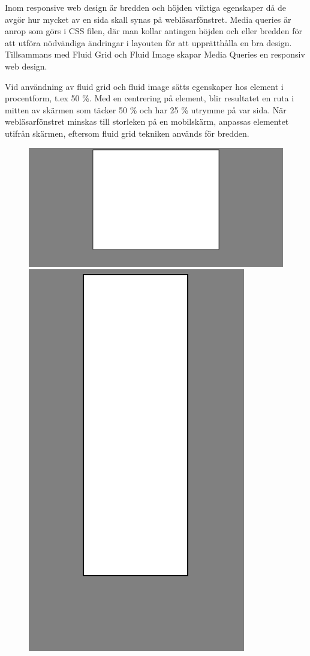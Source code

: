 \documentclass[11pt]{article}
\begin{document}
Inom responsive web design är bredden och höjden viktiga egenskaper då de avgör hur mycket av en sida skall synas på webläsarfönstret.  Media queries är anrop som görs i CSS filen, där man kollar antingen höjden och eller bredden för att utföra nödvändiga ändringar i layouten för att upprätthålla en bra design. Tillsammans med Fluid Grid och Fluid Image skapar Media Queries en responsiv web design. 

Vid användning av fluid grid och fluid image sätts egenskaper hos element i procentform, t.ex 50 \%. Med en centrering på element, blir resultatet en ruta i mitten av skärmen som täcker 50 \% och har 25 \% utrymme på var sida. När webläsarfönstret minskas till storleken på en mobilskärm, anpassas elementet utifrån skärmen, eftersom fluid grid tekniken används för bredden.

\vspace{0.5cm}
\begin{figure}[h]
\centerline{%
\includegraphics[scale=0.23]{pics/big.png}\hspace{5em}%
\includegraphics[scale=0.30]{pics/small.png}%
}
\end{figure}
\end{document}
